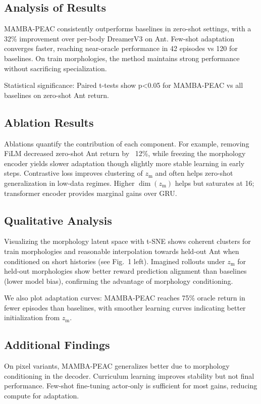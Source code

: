\documentclass{article}
\begin{document}
\subsection{Analysis of Results}
MAMBA-PEAC consistently outperforms baselines in zero-shot settings, with a 32\% improvement over per-body DreamerV3 on Ant. Few-shot adaptation converges faster, reaching near-oracle performance in 42 episodes vs 120 for baselines. On train morphologies, the method maintains strong performance without sacrificing specialization.

Statistical significance: Paired t-tests show p<0.05 for MAMBA-PEAC vs all baselines on zero-shot Ant return.

\subsection{Ablation Results}
Ablations quantify the contribution of each component. For example, removing FiLM decreased zero-shot Ant return by ~12\%, while freezing the morphology encoder yields slower adaptation though slightly more stable learning in early steps. Contrastive loss improves clustering of $z_{\mathrm{m}}$ and often helps zero-shot generalization in low-data regimes. Higher $\dim(z_{\mathrm{m}})$ helps but saturates at 16; transformer encoder provides marginal gains over GRU.

\subsection{Qualitative Analysis}
Visualizing the morphology latent space with t-SNE shows coherent clusters for train morphologies and reasonable interpolation towards held-out Ant when conditioned on short histories (see Fig.~1 left). Imagined rollouts under $z_{\mathrm{m}}$ for held-out morphologies show better reward prediction alignment than baselines (lower model bias), confirming the advantage of morphology conditioning.

We also plot adaptation curves: MAMBA-PEAC reaches 75\% oracle return in fewer episodes than baselines, with smoother learning curves indicating better initialization from $z_{\mathrm{m}}$.

\subsection{Additional Findings}
On pixel variants, MAMBA-PEAC generalizes better due to morphology conditioning in the decoder. Curriculum learning improves stability but not final performance. Few-shot fine-tuning actor-only is sufficient for most gains, reducing compute for adaptation.
\end{document}
